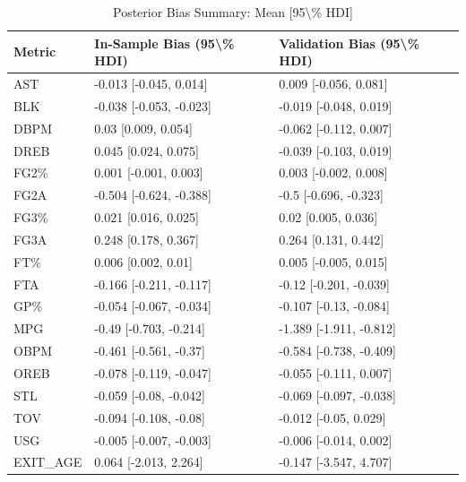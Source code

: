 \begin{table}[t]
\caption*{
{\fontsize{20}{25}\selectfont  Posterior Bias Summary: Mean [95\textbackslash{}\% HDI]\fontsize{12}{15}\selectfont }
} 
\fontsize{12.0pt}{14.0pt}\selectfont
\begin{tabular*}{\linewidth}{@{\extracolsep{\fill}}lll}
\toprule
Metric & In-Sample Bias (95\textbackslash{}\% HDI) & Validation Bias (95\textbackslash{}\% HDI) \\ 
\midrule\addlinespace[2.5pt]
AST & -0.013 [-0.045, 0.014] & 0.009 [-0.056, 0.081] \\ 
BLK & -0.038 [-0.053, -0.023] & -0.019 [-0.048, 0.019] \\ 
DBPM & 0.03 [0.009, 0.054] & -0.062 [-0.112, 0.007] \\ 
DREB & 0.045 [0.024, 0.075] & -0.039 [-0.103, 0.019] \\ 
FG2\% & 0.001 [-0.001, 0.003] & 0.003 [-0.002, 0.008] \\ 
FG2A & -0.504 [-0.624, -0.388] & -0.5 [-0.696, -0.323] \\ 
FG3\% & 0.021 [0.016, 0.025] & 0.02 [0.005, 0.036] \\ 
FG3A & 0.248 [0.178, 0.367] & 0.264 [0.131, 0.442] \\ 
FT\% & 0.006 [0.002, 0.01] & 0.005 [-0.005, 0.015] \\ 
FTA & -0.166 [-0.211, -0.117] & -0.12 [-0.201, -0.039] \\ 
GP\% & -0.054 [-0.067, -0.034] & -0.107 [-0.13, -0.084] \\ 
MPG & -0.49 [-0.703, -0.214] & -1.389 [-1.911, -0.812] \\ 
OBPM & -0.461 [-0.561, -0.37] & -0.584 [-0.738, -0.409] \\ 
OREB & -0.078 [-0.119, -0.047] & -0.055 [-0.111, 0.007] \\ 
STL & -0.059 [-0.08, -0.042] & -0.069 [-0.097, -0.038] \\ 
TOV & -0.094 [-0.108, -0.08] & -0.012 [-0.05, 0.029] \\ 
USG & -0.005 [-0.007, -0.003] & -0.006 [-0.014, 0.002] \\ 
EXIT\_AGE & 0.064 [-2.013, 2.264] & -0.147 [-3.547, 4.707] \\ 
\bottomrule
\end{tabular*}
\end{table}

